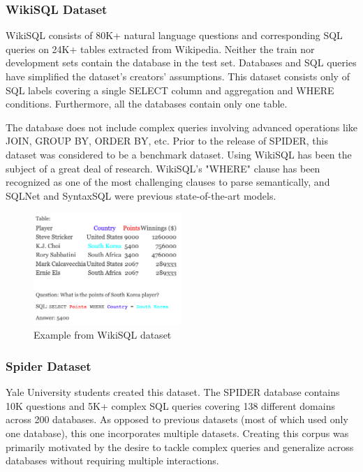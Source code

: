 \subsubsection*{WikiSQL Dataset}

WikiSQL consists of 80K+ natural language questions and corresponding SQL queries on 24K+ tables extracted from Wikipedia. Neither the train nor development sets contain the database in the test set. Databases and SQL queries have simplified the dataset's creators' assumptions. This dataset consists only of SQL labels covering a single SELECT column and aggregation and WHERE conditions. Furthermore, all the databases contain only one table.

The database does not include complex queries involving advanced operations like JOIN, GROUP BY, ORDER BY, etc. Prior to the release of SPIDER, this dataset was considered to be a benchmark dataset. Using WikiSQL has been the subject of a great deal of research. WikiSQL's "WHERE" clause has been recognized as one of the most challenging clauses to parse semantically, and SQLNet and SyntaxSQL were previous state-of-the-art models.


\begin{figure}[htb]
    \centering
    \includegraphics[width=0.5\textwidth]{pics/db/WikiSQL.png}
    \caption{Example from WikiSQL dataset\cite{hwang_comprehensive_2019}}
    \label{fig:WikiSQL}
\end{figure}


\subsubsection*{Spider Dataset}

Yale University students created this dataset.
The SPIDER database contains 10K questions and 5K+ complex SQL queries covering 138 different domains across 200 databases. As opposed to previous datasets (most of which used only one database), this one incorporates multiple datasets. Creating this corpus was primarily motivated by the desire to tackle complex queries and generalize across databases without requiring multiple interactions.

